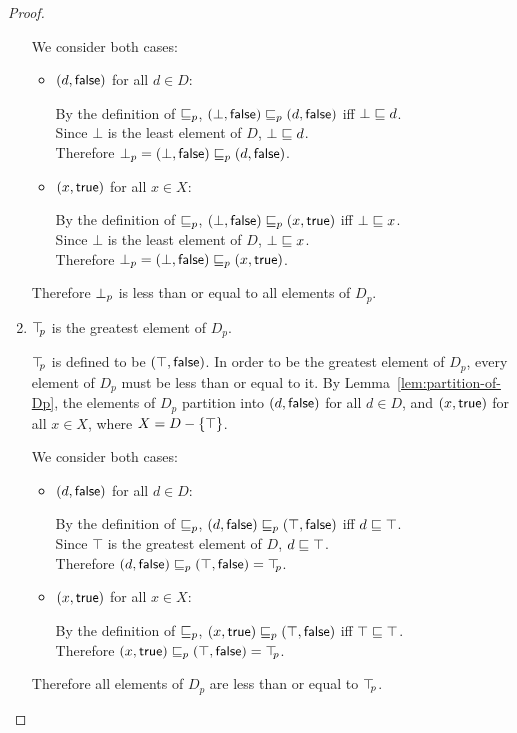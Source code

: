 \begin{proof}
\begin{enumerate}
  We consider both cases:

  \begin{itemize}
  \item $(d, \textsf{false})$ for all $d \in D$:

  By the definition of $\sqsubseteq_p$, $(\bot, \textsf{false}) \sqsubseteq_p (d, \textsf{false})$ iff $\bot \sqsubseteq d$. \\
  Since $\bot$ is the least element of $D$, $\bot \sqsubseteq d$. \\
  Therefore $\bot_{p} = (\bot, \textsf{false}) \sqsubseteq_p (d, \textsf{false})$.

  \item $(x, \textsf{true})$ for all $x \in X$:

  By the definition of $\sqsubseteq_p$, $(\bot, \textsf{false}) \sqsubseteq_p (x, \textsf{true})$ iff $\bot \sqsubseteq x$. \\
  Since $\bot$ is the least element of $D$, $\bot \sqsubseteq x$. \\
  Therefore $\bot_{p} = (\bot, \textsf{false}) \sqsubseteq_p (x, \textsf{true})$.

  \end{itemize}

  Therefore $\bot_{p}$ is less than or equal to all elements of $D_p$.

\item $\top\hspace{-0.85mm}_{p}$ is the greatest element of $D_p$.

$\top\hspace{-0.85mm}_{p}$ is defined to be $(\top, \textsf{false})$.  In order to be the
  greatest element of $D_p$, every element of $D_p$ must be less than
  or equal to it. By Lemma~\ref{lem:partition-of-Dp}, the elements of
  $D_p$ partition into $(d, \textsf{false})$ for all $d \in D$, and $(x, \textsf{true})$ for all $x \in X$, where $X = D - \left\{\top\right\}$.

  We consider both cases:

  \begin{itemize}
  \item $(d, \textsf{false})$ for all $d \in D$:

  By the definition of $\sqsubseteq_p$, $(d, \textsf{false}) \sqsubseteq_p (\top, \textsf{false})$ iff $d \sqsubseteq \top$. \\
  Since $\top$ is the greatest element of $D$, $d \sqsubseteq \top$. \\
  Therefore $(d, \textsf{false}) \sqsubseteq_p (\top, \textsf{false}) = \top\hspace{-0.85mm}_{p}$.

  \item $(x, \textsf{true})$ for all $x \in X$:

  By the definition of $\sqsubseteq_p$, $(x, \textsf{true}) \sqsubseteq_p (\top, \textsf{false})$ iff $\top \sqsubseteq \top$. \\
  Therefore $(x, \textsf{true}) \sqsubseteq_p (\top, \textsf{false}) = \top\hspace{-0.85mm}_{p}$.

  \end{itemize}

  Therefore all elements of $D_p$ are less than or equal to $\top\hspace{-0.85mm}_{p}$.
\end{enumerate}
\end{proof}
